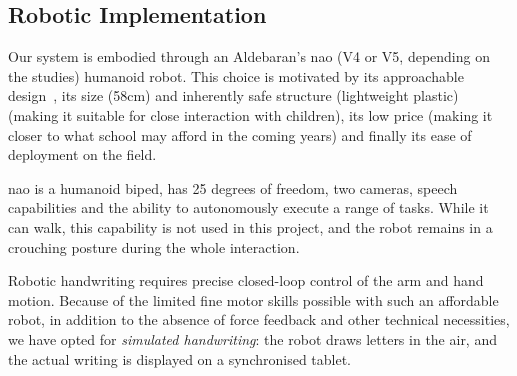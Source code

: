 \documentclass{article}
\begin{document}
\subsection{Robotic Implementation}

Our system is embodied through an Aldebaran's {\sc nao} (V4 or V5, depending on the studies)
humanoid robot. This choice is motivated by its approachable
design~\cite{Gouaillier2008}, its size (58cm) and inherently safe structure (lightweight
plastic) (making it suitable for close interaction with children), its low price
(making it closer to what school may afford in the coming years) and finally its
ease of deployment on the field.

{\sc nao} is a humanoid biped, has 25 degrees of freedom,
two cameras, speech capabilities and the ability to autonomously execute a range
of tasks. While it can walk, this capability is not used in this project, and
the robot remains in a crouching posture during the whole interaction.

Robotic handwriting requires precise closed-loop control of the arm and hand
motion. Because of the limited fine motor skills possible
with such an affordable robot, in addition to the absence of force feedback and
other technical necessities, we have opted for \emph{simulated
handwriting}: the robot draws letters in the air, and the actual writing is
displayed on a synchronised tablet.
\end{document}
